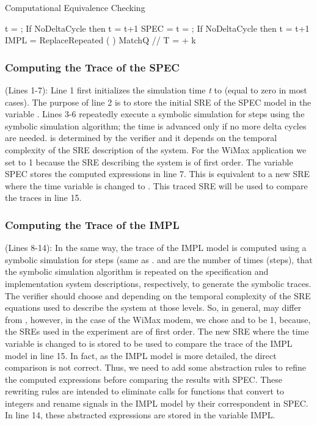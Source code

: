 \documentclass[submission,copyright,creativecommons]{eptcs}
\begin{document}
\begin{algorithm}
\caption{Computational Equivalence Checking}
\label{Algorithm : Computational Equivalence Checking}
\begin{algorithmic}[1]

\STATE t = ;
\STATE  
\WHILE{  }
\STATE 
\STATE If NoDeltaCycle then t = t+1
\ENDWHILE
\STATE SPEC = 
\STATE t = ;
\STATE     
\WHILE{  }
\STATE 
\STATE If NoDeltaCycle then t = t+1
\ENDWHILE
\STATE IMPL = ReplaceRepeated (  )
\STATE MatchQ   // T =  + k

\end{algorithmic}
\end{algorithm}

\subsubsection{Computing the Trace of the SPEC}

(Lines 1-7): Line 1 first initializes the simulation time \emph{t} to  (equal to zero in most cases). The purpose of line 2 is to store the initial SRE of the SPEC model in the variable . Lines 3-6 repeatedly execute a symbolic simulation for  steps using the symbolic simulation algorithm; the time is advanced only if no more delta cycles are needed.  is determined by the verifier and it depends on the temporal complexity of the SRE description of the system. For the WiMax application we set  to 1 because the SRE describing the system is of first order. The variable SPEC stores the computed expressions in line 7. This is equivalent to a new SRE where the time variable is changed to . This traced SRE will be used to compare the traces in line 15.

\subsubsection{Computing the Trace of the IMPL}

(Lines 8-14): In the same way, the trace of the IMPL model is computed using a symbolic simulation for  steps (same as .  and  are the number of times (steps), that the symbolic simulation algorithm is repeated on the specification and implementation system descriptions, respectively, to generate the symbolic traces. The verifier should choose  and  depending on the temporal complexity of the SRE equations used to describe the system at those levels. So, in general,  may differ from , however, in the case of the WiMax modem, we chose  and  to be 1, because, the SREs used in the experiment are of first order. The new SRE where the time variable is changed to  is stored to be used to compare the trace of the IMPL model in line 15. In fact, as the IMPL model is more detailed, the direct comparison is not correct. Thus, we need to add some abstraction rules to refine the computed expressions before comparing the results with SPEC. These rewriting rules  are intended to eliminate calls for functions that convert to integers and rename signals in the IMPL model by their correspondent in SPEC. In line 14, these abstracted expressions are stored in the variable IMPL.
\end{document}
